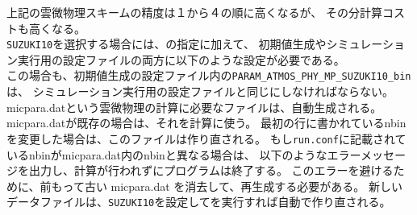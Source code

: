 \begin{enumerate}
\end{enumerate}

上記の雲微物理スキームの精度は１から４の順に高くなるが、
その分計算コストも高くなる。\\


\verb|SUZUKI10|を選択する場合には、の指定に加えて、
初期値生成やシミュレーション実行用の設定ファイルの両方に以下のような設定が必要である。\\
この場合も、初期値生成の設定ファイル内の\verb|PARAM_ATMOS_PHY_MP_SUZUKI10_bin|は、
シミュレーション実行用の設定ファイルと同じにしなければならない。
micpara.datという雲微物理の計算に必要なファイルは、自動生成される。
micpara.datが既存の場合は、それを計算に使う。
最初の行に書かれているnbinを変更した場合は、このファイルは作り直される。
もし\verb|run.conf|に記載されているnbinがmicpara.dat内のnbinと異なる場合は、
以下のようなエラーメッセージを出力し、計算が行われずにプログラムは終了する。
このエラーを避けるために、前もって古い micpara.dat を消去して、再生成する必要がある。
新しいデータファイルは、\verb|SUZUKI10|を設定して\scalerm を実行すれば自動で作り直される。
